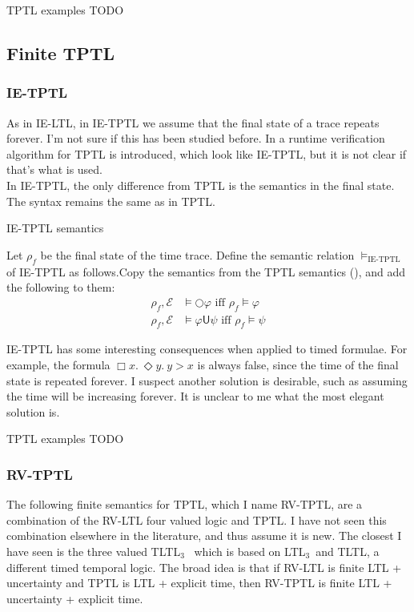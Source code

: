 \documentclass[a4paper]{article}
\newcommand{\U}{\mathsf{U}}
\newcommand{\tiff}{\text{ iff }}
\newcommand{\eval}{\mathcal{E}}
\newcommand{\ltlt}{LTL$_3$}
\begin{document}
\begin{eg}{TPTL examples}
  TODO
\end{eg}

\subsection{Finite TPTL}

\subsubsection{IE-TPTL} As in IE-LTL, in IE-TPTL we assume that the final state of a trace repeats forever.  I'm not sure if this has been studied before. In \textcite{chai2013rewriting} a runtime verification algorithm for TPTL is introduced, which look like IE-TPTL, but it is not clear if that's what is used.\\
In IE-TPTL, the only difference from TPTL is the semantics in the final state. The syntax remains the same as in TPTL.

\begin{defn}{IE-TPTL semantics}

  Let $\rho_f$ be the final state of the time trace. Define the semantic relation $\vDash_{\text{IE-TPTL}}$ of IE-TPTL as follows.Copy the semantics from the TPTL semantics (), and add the following to them:
  \begin{align*}
    \rho_f,\eval &\vDash \bigcirc \varphi \tiff \rho_f \vDash \varphi\\
    \rho_f,\eval &\vDash \varphi \U \psi \tiff \rho_f \vDash \psi
  \end{align*}
\end{defn}

\begin{remk}
IE-TPTL has some interesting consequences when applied to timed formulae. For example, the formula $\Box x.~ \Diamond y.~ y > x$ is always false, since the time of the final state is repeated forever. I suspect another solution is desirable, such as assuming the time will be increasing forever. It is unclear to me what the most elegant solution is.
\end{remk}

\begin{eg}{TPTL examples}
  TODO
\end{eg}

\subsubsection{RV-TPTL} The following finite semantics for TPTL, which I name RV-TPTL, are a combination of the RV-LTL four valued logic and TPTL. I have not seen this combination elsewhere in the literature, and thus assume it is new. The closest I have seen is the three valued TLTL$_3$~\autocite[6]{arafat2005runtime} which is based on \ltlt\ and TLTL, a different timed temporal logic. The broad idea is that if RV-LTL is finite LTL + uncertainty and TPTL is LTL + explicit time, then RV-TPTL is finite LTL + uncertainty + explicit time.
\end{document}
